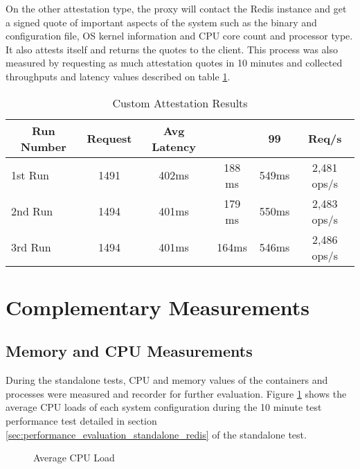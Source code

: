 On the other attestation type, the proxy will contact the Redis instance and get a signed quote of important aspects of the system such as the binary and configuration file, \gls{OS} kernel information and \gls{CPU} core count and processor type. It also attests itself and returns the quotes to the client. This process was also measured by requesting as much attestation quotes in 10 minutes and collected throughputs and latency values described on table \ref{tab:custom_attestation_results}.

\begin{table}[ht]
	\caption{Custom Attestation Results}
	\label{tab:custom_attestation_results}
\centering
\begin{tabular}{lccccc}
	\toprule
	\multicolumn{1}{c}{\textbf{Run Number}} & \pmb{\#}\textbf{Request} & \textbf{Avg Latency} & \pmb{\ensuremath{\sigma}} & \textbf{99}\pmb{\%} & \textbf{Req/s} \\
	\midrule
		1st Run & 1491 & 402ms & 188	ms & 549ms & 2,481 ops/s \\
		2nd Run & 1494 & 401ms & 179	ms & 550ms & 2,483 ops/s \\
		3rd Run & 1494 & 401ms & 164ms & 546ms & 2,486 ops/s \\
	\bottomrule
\end{tabular}
\end{table}

\section{Complementary Measurements}
\label{sec:complementary_measurements}

\subsection{Memory and CPU Measurements}
\label{ssec:memory_and_cpu_measurements}

During the standalone tests, \gls{CPU} and memory values of the containers and processes were measured and recorder for further evaluation. Figure \ref{fig:average_cpu_load} shows the average \gls{CPU} loads of each system configuration during the 10 minute test performance test detailed in section \ref{sec:performance_evaluation_standalone_redis} of the standalone test.

\begin{figure}[htbp]
  \caption{Average CPU Load}
  \label{fig:average_cpu_load}
\end{figure}

